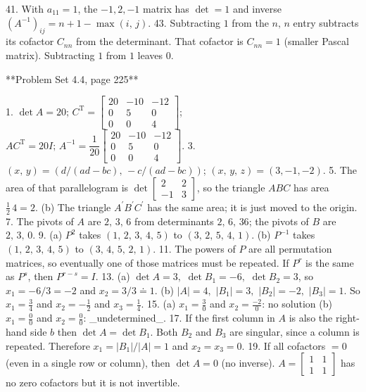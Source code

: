 41. With \(a_{11}=1\), the \(-1,2,-1\) matrix has \(\det=1\) and inverse \((A^{-1})_{ij}=n+1-\max(i,\,j)\).
43. Subtracting \(1\) from the \(n,\,n\) entry subtracts its cofactor \(C_{nn}\) from the determinant. That cofactor is \(C_{nn}=1\) (smaller Pascal matrix). Subtracting \(1\) from \(1\) leaves \(0\).

**Problem Set 4.4, page 225**

1. \(\det A=20;\,C^{\mathrm{T}}=\begin{bmatrix}20&-10&-12\\ 0&5&0\\ 0&0&4\end{bmatrix}\); \(AC^{\mathrm{T}}=20I;\,A^{-1}=\dfrac{1}{20}\begin{bmatrix}20&-10&-12\\ 0&5&0\\ 0&0&4\end{bmatrix}\).
3. \((x,\,y)=(d/(ad-bc),\,-c/(ad-bc))\); \((x,\,y,\,z)=(3,-1,-2)\).
5. The area of that parallelogram is \(\det\begin{bmatrix}2&2\\ -1&3\end{bmatrix}\), so the triangle \(ABC\) has area \(\frac{1}{2}\,4=2\). (b) The triangle \(A^{\prime}B^{\prime}C^{\prime}\) has the same area; it is just moved to the origin.
7. The pivots of \(A\) are \(2,\,3,\,6\) from determinants \(2,\,6,\,36\); the pivots of \(B\) are \(2,\,3,\,0\).
9. (a) \(P^{2}\) takes \((1,\,2,\,3,\,4,\,5)\) to \((3,\,2,\,5,\,4,\,1)\). (b) \(P^{-1}\) takes \((1,\,2,\,3,\,4,\,5)\) to \((3,\,4,\,5,\,2,\,1)\).
11. The powers of \(P\) are all permutation matrices, so eventually one of those matrices must be repeated. If \(P^{r}\) is the same as \(P^{s}\), then \(P^{r-s}=I\).
13. (a) \(\det A=3,\,\,\det B_{1}=-6,\,\,\det B_{2}=3\), so \(x_{1}=-6/3=-2\) and \(x_{2}=3/3\doteq 1\). (b) \(|A|=4,\,\,|B_{1}|=3,\,\,|B_{2}|=-2,\,\,|B_{3}|=1\). So \(x_{1}=\frac{3}{4}\) and \(x_{2}=-\frac{1}{2}\) and \(x_{3}=\frac{1}{4}\).
15. (a) \(x_{1}=\frac{3}{0}\) and \(x_{2}=\frac{-2}{0}\): no solution (b) \(x_{1}=\frac{0}{0}\) and \(x_{2}=\frac{0}{0}\): _undetermined_.
17. If the first column in \(A\) is also the right-hand side \(b\) then \(\det A=\det B_{1}\). Both \(B_{2}\) and \(B_{3}\) are singular, since a column is repeated. Therefore \(x_{1}=|B_{1}|/|A|=1\) and \(x_{2}=x_{3}=0\).
19. If all cofactors \(=0\) (even in a single row or column), then \(\det A=0\) (no inverse). \(A=\begin{bmatrix}1&1\\ 1&1\end{bmatrix}\) has no zero cofactors but it is not invertible.
